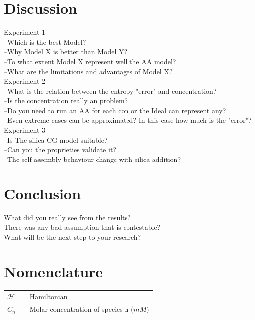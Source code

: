 \documentclass[10pt,a4paper,twoside]{article}
\begin{document}
\section{Discussion}


Experiment 1\\
 --Which is the best Model?\\
 --Why Model X is better than Model Y?\\
 --To what extent Model X represent well the AA model?\\
 --What are the limitations and advantages of Model X?\\
Experiment 2\\
 --What is the relation between the entropy "error" and concentration? \\
 --Is the concentration really an problem?\\
 --Do you need to run an AA for each con or the Ideal can represent any?\\
 --Even extreme cases can be approximated? In this case how much is the "error"?\\
Experiment 3\\
 --Is The silica CG model suitable? \\
 --Can you the proprieties validate it?\\
 --The self-assembly behaviour change with silica addition?\\

\section{Conclusion}

 What did you really see from the results?\\
 There was any bad assumption that is contestable?\\
 What will be the next step to your research? \\
 
\section{Nomenclature} 
   \begin{tabulary}{1.0\textwidth}{LCL}
   $\mathcal{H}$ &   & Hamiltonian \\
   $C_n$ &   & Molar concentration of species n ($mM$) \\
   \end{tabulary}
\end{document}
